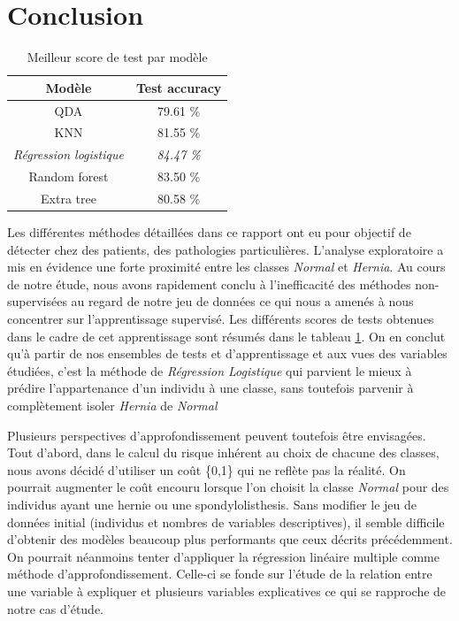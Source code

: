 \documentclass[twocolumn,10pt]{article}
\begin{document}
\section{Conclusion}

\begin{table}[htbp]
    \begin{center}
        \caption{\label{tab:accuracy_modèle}Meilleur score de test par modèle}
        \begin{tabular}{c|c}
            Modèle &  Test accuracy \\
            \hline
            QDA &  79.61 \%\\
            KNN & 81.55 \%  \\
            \textit{Régression logistique} &  \textit{84.47 \%} \\
            Random forest &  83.50 \% \\
            Extra tree &  80.58 \% \\
        \end{tabular}
    \end{center}
\end{table}

Les différentes méthodes détaillées dans ce rapport ont eu pour objectif de détecter chez des patients, des pathologies particulières. L'analyse exploratoire a mis en évidence une forte proximité entre les classes \textit{Normal} et \textit{Hernia}. Au cours de notre étude, nous avons rapidement conclu à l'inefficacité des méthodes non-supervisées au regard de notre jeu de données ce qui nous a amenés à nous concentrer sur l'apprentissage supervisé. Les différents scores de tests obtenues dans le cadre de cet apprentissage sont résumés dans le tableau \ref{tab:accuracy_modèle}. On en conclut qu'à partir de nos ensembles de tests et d'apprentissage et aux vues des variables étudiées, c'est la méthode de \textit{Régression Logistique} qui parvient le mieux à prédire l'appartenance d'un individu à une classe, sans toutefois parvenir à complètement isoler \textit{Hernia} de \textit{Normal}
 
 Plusieurs perspectives d'approfondissement peuvent toutefois être envisagées. Tout d'abord, dans le calcul du risque inhérent au choix de chacune des classes, nous avons décidé d'utiliser un coût \{0,1\} qui ne reflète pas la réalité. On pourrait augmenter le coût encouru lorsque l'on choisit la classe \textit{Normal} pour des individus ayant une hernie ou une spondylolisthesis. Sans modifier le jeu de données initial (individus et nombres de variables descriptives), il semble difficile d'obtenir des modèles beaucoup plus performants que ceux décrits précédemment. On pourrait néanmoins tenter d'appliquer la régression linéaire multiple comme méthode d'approfondissement. Celle-ci se fonde sur l'étude de la relation entre une variable à expliquer et plusieurs variables explicatives ce qui se rapproche de notre cas d'étude.
 

\appendix %

\printbibliography
\end{document}
